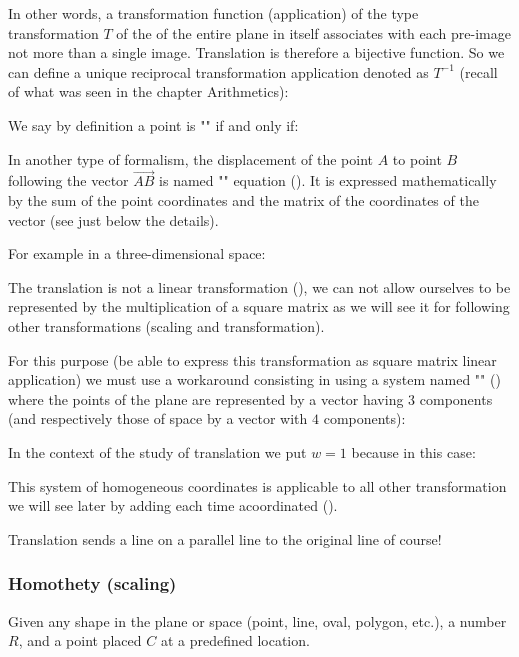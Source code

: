	In other words, a transformation function (application) of the type transformation $T$ of the of the entire plane in itself associates with each pre-image not more than a single image. Translation is therefore a bijective function. So we can define a unique reciprocal transformation application denoted as $T^{-1}$ (recall of what was seen in the chapter Arithmetics):
	
	We say by definition a point is "" if and only if:
	
	In another type of formalism, the displacement of the point $A$ to point $B$ following the vector $\overrightarrow{AB}$ is named "" equation (). It is expressed mathematically by the sum of the point coordinates and the matrix of the coordinates of the vector (see just below the details).
	
	For example in a three-dimensional space:
	
	The translation is not a linear transformation (), we can not allow ourselves to be represented by the multiplication of a square matrix as we will see it for following other transformations (scaling and transformation).

	For this purpose (be able to express this transformation as square matrix linear application) we must use a workaround consisting in using a system named "" () where the points of the plane are represented by a vector having $3$ components (and respectively those of space by a vector with $4$ components):
	
	In the context of the study of translation we put $w=1$ because in this case:
	
	This system of homogeneous coordinates is applicable to all other transformation we will see later by adding each time acoordinated ().
	\begin{tcolorbox}[title=Remark,colframe=black,arc=10pt]
	Translation sends a line on a parallel line to the original line of course!	
	\end{tcolorbox}

	\subsubsection{Homothety (scaling)}	
	Given any shape in the plane or space (point, line, oval, polygon, etc.), a number $R$, and a point placed $C$ at a predefined location.

